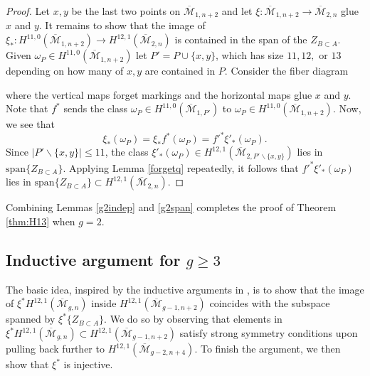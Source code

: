 \documentclass[12pt]{amsart}
\theoremstyle{definition}
\numberwithin{equation}{section}
\newcommand{\M}{\mathcal{M}}
\newcommand{\Mb}{\overline{\M}}
\theoremstyle{definition} %
\theoremstyle{remark}
\begin{document}
\begin{proof}
Let $x, y$ be the last two points on $\Mb_{1,n+2}$ and let $\xi\colon \Mb_{1,n+2} \to \Mb_{2,n}$ glue $x$ and $y$.
It remains to show that the image of $\xi_*\colon H^{11,0}(\Mb_{1,n+2}) \to H^{12,1}(\Mb_{2,n})$ is contained in the span of the $Z_{B \subset A}$.
Given $\omega_P \in H^{11,0}(\Mb_{1,n+2})$ let $P' = P \cup \{x, y\}$, which has size $11,12,$ or $13$ depending on how many of $x, y$ are contained in $P$.
Consider the fiber diagram
\begin{center}
\end{center}
where the vertical maps forget markings and the horizontal maps glue $x$ and $y$. Note that $f^*$ sends the class $\omega_P \in H^{11,0}(\Mb_{1,P'})$ to $\omega_P \in H^{11,0}(\Mb_{1,n+2})$. Now, we see that
\[\xi_*(\omega_P) = \xi_*f^*(\omega_P) = f'^*\xi'_*(\omega_P).\]
 Since $|P' \smallsetminus \{x,y\}| \leq 11$, the class $\xi'_*(\omega_P) \in H^{12,1}(\Mb_{2, P' \smallsetminus \{x, y\}})$ lies in $\mathrm{span}\{Z_{B \subset A}\}$. Applying Lemma \ref{forgetq} repeatedly, it follows that $f'^*\xi'_*(\omega_P)$ lies in $\mathrm{span}\{Z_{B \subset A}\} \subset H^{12,1}(\Mb_{2,n})$.
\end{proof}

Combining Lemmas \ref{g2indep} and \ref{g2span} completes the proof of Theorem \ref{thm:H13} when $g = 2$.



\subsection{Inductive argument for \texorpdfstring{$g \geq 3$}{g>=3}}
\label{ind}
The basic idea, inspired by the inductive arguments in \cite[\S4]{ArbarelloCornalba}, is to show that the image of $\xi^*H^{12,1}(\Mb_{g,n})$ inside $H^{12,1}(\Mb_{g-1,n+2})$ coincides with the subspace spanned by $\xi^*\{Z_{B \subset A}\}$. We do so by observing that elements in $\xi^*H^{12,1}(\Mb_{g,n}) \subset H^{12,1}(\Mb_{g-1,n+2})$ satisfy strong symmetry conditions upon pulling back further to $H^{12,1}(\Mb_{g-2,n+4})$. 
To finish the argument, we then show that $\xi^*$ is injective.
\end{document}
